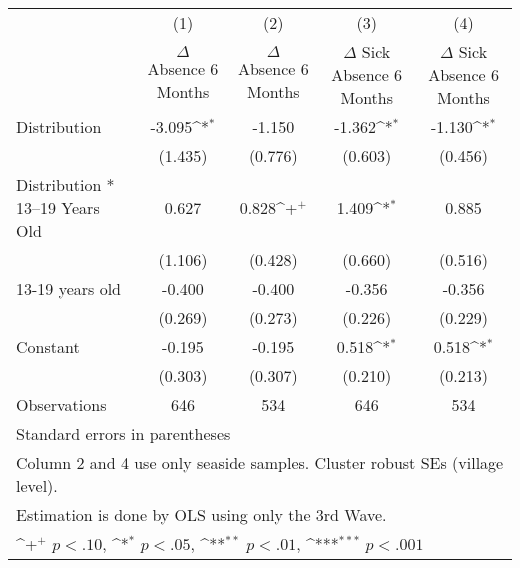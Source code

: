 {
\def\sym#1{\ifmmode^{#1}\else\(^{#1}\)\fi}
\begin{tabular}{l*{4}{c}}
\hline\hline
                    &\multicolumn{1}{c}{(1)}&\multicolumn{1}{c}{(2)}&\multicolumn{1}{c}{(3)}&\multicolumn{1}{c}{(4)}\\
                    &\multicolumn{1}{c}{$\Delta$ Absence 6 Months}&\multicolumn{1}{c}{$\Delta$ Absence 6 Months}&\multicolumn{1}{c}{$\Delta$ Sick Absence 6 Months}&\multicolumn{1}{c}{$\Delta$ Sick Absence 6 Months}\\
\hline
Distribution        &      -3.095\sym{*}  &      -1.150         &      -1.362\sym{*}  &      -1.130\sym{*}  \\
                    &     (1.435)         &     (0.776)         &     (0.603)         &     (0.456)         \\
[1em]
Distribution * 13--19 Years Old&       0.627         &       0.828\sym{+}  &       1.409\sym{*}  &       0.885         \\
                    &     (1.106)         &     (0.428)         &     (0.660)         &     (0.516)         \\
[1em]
13-19 years old     &      -0.400         &      -0.400         &      -0.356         &      -0.356         \\
                    &     (0.269)         &     (0.273)         &     (0.226)         &     (0.229)         \\
[1em]
Constant            &      -0.195         &      -0.195         &       0.518\sym{*}  &       0.518\sym{*}  \\
                    &     (0.303)         &     (0.307)         &     (0.210)         &     (0.213)         \\
\hline
Observations        &         646         &         534         &         646         &         534         \\
\hline\hline
\multicolumn{5}{l}{\footnotesize Standard errors in parentheses}\\
\multicolumn{5}{l}{\footnotesize Column 2 and 4 use only seaside samples. Cluster robust SEs (village level).}\\
\multicolumn{5}{l}{\footnotesize Estimation is done by OLS using only the 3rd Wave.}\\
\multicolumn{5}{l}{\footnotesize \sym{+} \(p<.10\), \sym{*} \(p<.05\), \sym{**} \(p<.01\), \sym{***} \(p<.001\)}\\
\end{tabular}
}
